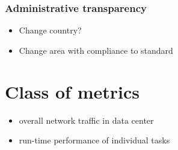 \subsubsection{Administrative transparency}
\begin{itemize}
\item Change country?
\item Change area with compliance to standard
\end{itemize}

\section{Class of metrics}

\begin{itemize}
	\item overall network traffic in data center
	\item run-time performance of individual tasks
\end{itemize}

%
%

